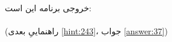 \section{}
\paragraph{}\label{hint:217}
خروجی برنامه این است:
\LTR\noindent
{}\\
\\
\RTL
(راهنماییِ بعدی \ref{hint:243}، جواب \ref{answer:37})
